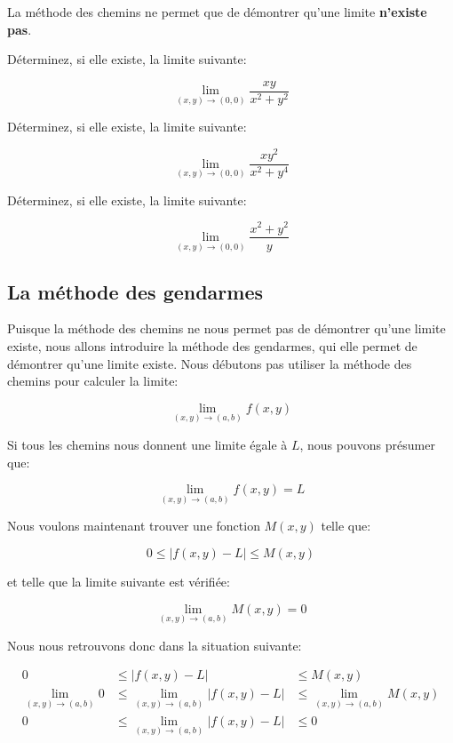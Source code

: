 \documentclass[]{book}
\theoremstyle{definition}
\theoremstyle{definition}
\theoremstyle{definition}
\theoremstyle{remark}
\let\BeginKnitrBlock\begin \let\EndKnitrBlock\end
\begin{document}
\BeginKnitrBlock{remark}
{}La méthode des chemins ne permet que de
démontrer qu'une limite \textbf{n'existe pas}.
\EndKnitrBlock{remark}

\BeginKnitrBlock{example}
\protect\hypertarget{exm:unnamed-chunk-139}{}{\label{exm:unnamed-chunk-139}
}Déterminez, si elle existe, la limite suivante:

\[ \lim_{(x,y)\to (0,0)}\dfrac{xy}{x^2+y^2} \]
\EndKnitrBlock{example}

\BeginKnitrBlock{example}
\protect\hypertarget{exm:unnamed-chunk-140}{}{\label{exm:unnamed-chunk-140}
}Déterminez, si elle existe, la limite suivante:

\[ \lim_{(x,y)\to (0,0)}\dfrac{xy^2}{x^2+y^4} \]
\EndKnitrBlock{example}

\BeginKnitrBlock{example}
\protect\hypertarget{exm:unnamed-chunk-141}{}{\label{exm:unnamed-chunk-141}
}Déterminez, si elle existe, la limite suivante:

\[ \lim_{(x,y)\to (0,0)}\dfrac{x^2+y^2}{y} \]
\EndKnitrBlock{example}

\hypertarget{la-methode-des-gendarmes}{%
\subsection{La méthode des gendarmes}\label{la-methode-des-gendarmes}}

Puisque la méthode des chemins ne nous permet pas de démontrer qu'une
limite existe, nous allons introduire la méthode des gendarmes, qui elle
permet de démontrer qu'une limite existe. Nous débutons pas utiliser la
méthode des chemins pour calculer la limite:

\[ \lim_{(x,y)\to (a,b)}f(x,y) \]

Si tous les chemins nous donnent une limite égale à \(L\), nous pouvons
présumer que:

\[ \lim_{(x,y)\to (a,b)}f(x,y)=L \]

Nous voulons maintenant trouver une fonction \(M(x,y)\) telle que:

\[ 0 \leq |f(x,y)-L| \leq M(x,y) \]

et telle que la limite suivante est vérifiée:

\[ \lim_{(x,y)\to (a,b)} M(x,y) = 0 \]

Nous nous retrouvons donc dans la situation suivante:

\begin{align*}
0 &\leq |f(x,y)-L| &\leq M(x,y) \\
\lim_{(x,y)\to (a,b)} 0 &\leq \lim_{(x,y)\to (a,b)}|f(x,y)-L| &\leq \lim_{(x,y)\to (a,b)}M(x,y) \\
0 &\leq \lim_{(x,y)\to (a,b)}|f(x,y)-L| &\leq 0
\end{align*}
\end{document}

